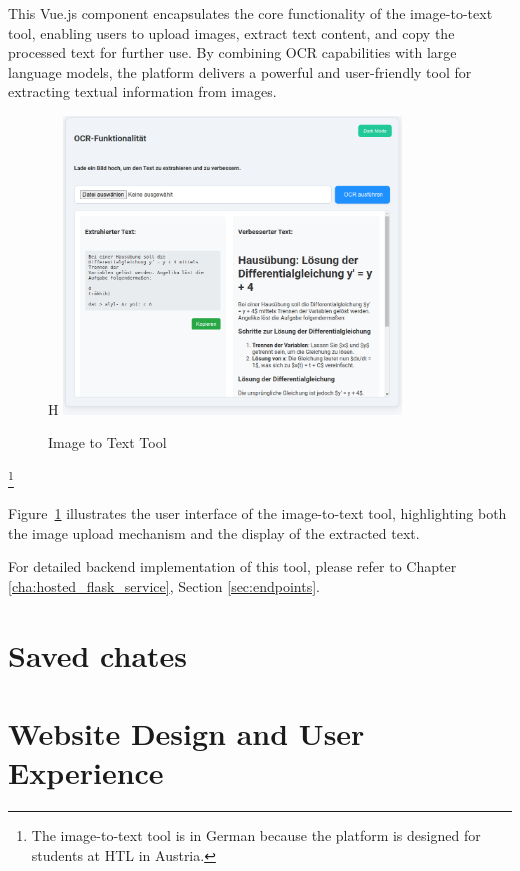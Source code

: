 This Vue.js component encapsulates the core functionality of the image-to-text tool, enabling users to upload images, extract text content, 
and copy the processed text for further use. By combining OCR capabilities with large language models, 
the platform delivers a powerful and user-friendly tool for extracting textual information from images.

\begin{figure}{H}
    \centering
    \includegraphics[width=0.8\textwidth]{figures/OCR-functonalatie.png}
    \caption{Image to Text Tool}
    \label{fig:image-to-text-tool}
\end{figure}
\footnote{The image-to-text tool is in German because the platform is designed for students at HTL in Austria.}

Figure~\ref{fig:image-to-text-tool} illustrates the user interface of the image-to-text tool, highlighting both the image upload mechanism and the display of the extracted text.

For detailed backend implementation of this tool, please refer to Chapter \ref{cha:hosted_flask_service}, Section \ref{sec:endpoints}.


\section{Saved chates}

\section{Website Design and User Experience} 

